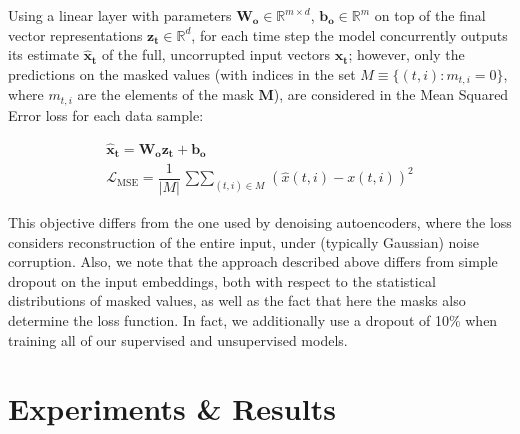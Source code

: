 \documentclass{article} \usepackage{iclr2021_conference,times}
\begin{document}
Using a linear layer with parameters $\mathbf{W_o} \in \mathbb{R}^{m\times d}$, $\mathbf{b_o}  \in \mathbb{R}^{m}$ on top of the final vector representations $\mathbf{z_t} \in \mathbb{R}^{d}$, for each time step the model concurrently outputs its estimate $\mathbf{\hat{x}_t}$ of the full, uncorrupted input vectors $\mathbf{x_t}$; however, only the predictions on the masked values (with indices in the set $M \equiv \{(t,i): m_{t,i} = 0\}$, where $m_{t,i}$ are the elements of the mask $\mathbf{M}$), are considered in the Mean Squared Error loss for each data sample:

\begin{gather}
\mathbf{\hat{x}_t} = \mathbf{W_o}\mathbf{z_t} + \mathbf{b_o} \label{eq:prediction}\\
\mathcal{L}_\text{MSE} = \dfrac{1}{|M|}\mathop{\sum \sum}_{(t,i)\in M} \left(\hat{x}(t,i) - x(t,i)\right)^2\label{eq:loss_mse}
\end{gather}

This objective differs from the one used by denoising autoencoders, where the loss considers reconstruction of the entire input, under (typically Gaussian) noise corruption. Also, we note that the approach described above differs from simple dropout on the input embeddings, both with respect to the statistical distributions of masked values, as well as the fact that here the masks also determine the loss function. In fact, we additionally use a dropout of 10\% when training all of our supervised and unsupervised models.


\section{Experiments \& Results}
\end{document}
